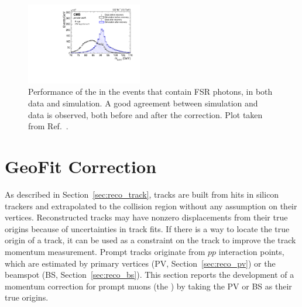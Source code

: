 \begin{figure}[!htb]
      \centering
      \includegraphics[width=0.45\textwidth]{pics/muon_corr/FSR/FSRrecovery_Validation.pdf}
      \caption{Performance of the \FSR in the \zmm events that contain FSR photons, in both data and simulation. 
               A good agreement between simulation and data is observed, both before and after the correction.
               Plot taken from Ref.~\cite{oliverthesis}.}
      \label{fig:fsr_val}
\end{figure}


\section{GeoFit Correction} \label{sec:GeoFit}

As described in Section~\ref{sec:reco_track},
tracks are built from hits in silicon trackers and extrapolated to the collision region
without any assumption on their vertices.
Reconstructed tracks may have nonzero displacements from their true origins because of uncertainties in track fits.
If there is a way to locate the true origin of a track, 
it can be used as a constraint on the track to improve the track momentum measurement.
Prompt tracks originate from $pp$ interaction points, 
which are estimated by primary vertices (PV, Section~\ref{sec:reco_pv}) or the beamspot (BS, Section~\ref{sec:reco_bs}).
This section reports the development of a momentum correction for prompt muons (the \GeoFit)
by taking the PV or BS as their true origins.

